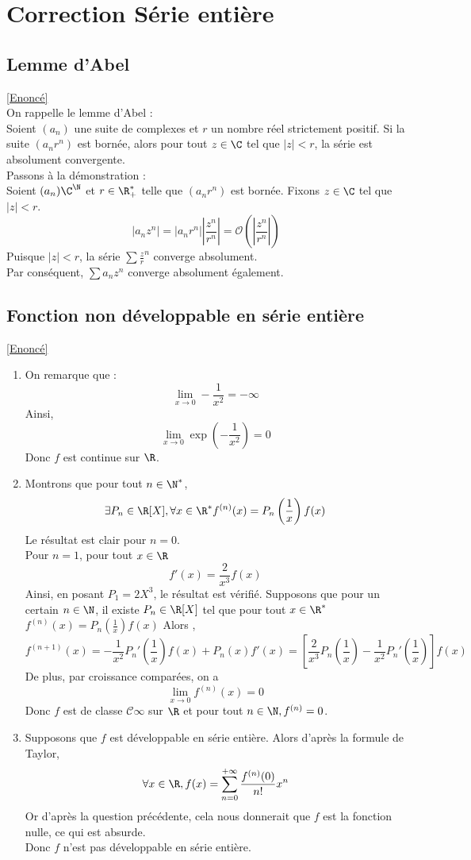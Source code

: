 \documentclass{book}
\begin{document}
	\newpage
\section{Correction Série entière}
	\subsection{Lemme d'Abel}\label{sec:lemme-dabel}
		\textcolor{blue}{\hyperref[Lemme d'Abel]{[Enoncé]}}\\
		On rappelle le lemme d'Abel :\\
		Soient $(a_n)$ une suite de complexes et $r$ un nombre réel strictement positif. Si la suite $(a_nr^n)$ est bornée, alors pour tout $z\in\C$ tel que $|z|<r$, la série est absolument convergente.\\
		Passons à la démonstration :\\
		Soient $(a_n)\C^\N$ et $r\in\R^*_+$ telle que $(a_nr^n)$ est bornée.
		Fixons $z\in\C$ tel que $|z|<r$.\\
		\[|a_nz^n|=|a_nr^n|\left|\frac{z^n}{r^n}\right|=\mathcal{O}(\left|\frac{z^n}{r^n}\right|) \]
		Puisque $|z|< r$, la série $\sum \frac{z}{r}^n$ converge absolument.\\
		Par conséquent, $\sum a_nz^n$ converge absolument également.
	\subsection{Fonction non développable en série entière}\label{sec:fonction-non-developpable-en-serie-entiere}
	\textcolor{blue}{\hyperref[Fonction non développable en série entière]{[Enoncé]}}\\
	\begin{enumerate}[leftmargin=*]
		\item On remarque que :
			\[\lim\limits_{x\to 0}-\frac{1}{x^2}=-\infty\]
		Ainsi, \[\lim\limits_{x\to 0}\exp\left(-\frac{1}{x^2}\right)=0\]
		Donc $f$ est continue sur $\R$.
		\item Montrons que pour tout $n\in \N^*$, \[\exists P_n\in\R[X],\forall x\in \R^* f^{(n)}(x)=P_n\left(\frac{1}{x}\right)f(x)\]
		Le résultat est clair pour $n=0$.\\
		Pour $n=1$, pour tout $x\in\R$ \[f'(x)=\frac{2}{x^3}f(x)\]
		Ainsi, en posant $P_1=2X^3$, le résultat est vérifié.
		Supposons que pour un certain $n\in \N$, il existe $P_n\in \R[X]$ tel que pour tout $x\in\R^*$ $f^{(n)}(x)=P_n\left(\frac{1}{x}\right)f(x)$
		Alors , \[f^{(n+1)}(x)=-\frac{1}{x^2}P_n'\left(\frac{1}{x}\right)f(x)+P_n(x)f'(x)=\left[\frac{2}{x^3}P_n\left(\frac{1}{x}\right)-\frac{1}{x^2}P_n'\left(\frac{1}{x}\right)\right]f(x)\]
		De plus, par croissance comparées, on a \[\lim\limits_{x\to 0}f^{(n)}(x)=0\]
		Donc $f$ est de classe $\mathcal{C}\infty$ sur $\R$ et pour tout $n\in\N, f^{(n)}=0$.
		\item Supposons que $f$ est développable en série entière. 
		Alors d'après la formule de Taylor, \[\forall x\in\R, f(x)=\sum_{n=0}^{+\infty}\frac{f^{(n)}(0)}{n!}x^n\]
		Or d'après la question précédente, cela nous donnerait que $f$ est la fonction nulle, ce qui est absurde.\\
		Donc $f$ n'est pas développable en série entière.
	\end{enumerate}
	
\end{document}
